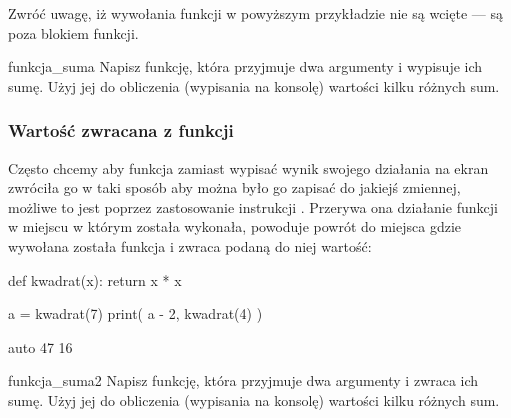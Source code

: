 \documentclass{pdfBooklets}
\begin{document}
\noindent
Zwróć uwagę, iż wywołania funkcji w powyższym przykładzie nie są wcięte --- są poza blokiem funkcji.


\begin{Zadanie}{}{funkcja_suma}
Napisz funkcję, która przyjmuje dwa argumenty i wypisuje ich sumę. Użyj jej do obliczenia (wypisania na konsolę) wartości kilku różnych sum.
\end{Zadanie}

\subsubsection{Wartość zwracana z funkcji}

Często chcemy aby funkcja zamiast wypisać wynik swojego działania na ekran zwróciła go w taki sposób aby można było go zapisać do jakiejś zmiennej,
możliwe to jest poprzez zastosowanie instrukcji . Przerywa ona działanie funkcji w miejscu w którym została wykonała,
powoduje powrót do miejsca gdzie wywołana została funkcja i zwraca podaną do niej wartość:

\begin{CodeFrame}[python]{.5\textwidth}
def kwadrat(x):
  return x * x

a = kwadrat(7)
print( a - 2, kwadrat(4) )
\end{CodeFrame}
\begin{CodeFrame}{auto}
47 16
\end{CodeFrame}

\vspace{-13pt}

\begin{Zadanie}{}{funkcja_suma2}
Napisz funkcję, która przyjmuje dwa argumenty i zwraca ich sumę. Użyj jej do obliczenia (wypisania na konsolę) wartości kilku różnych sum.

\end{Zadanie}
\end{document}
